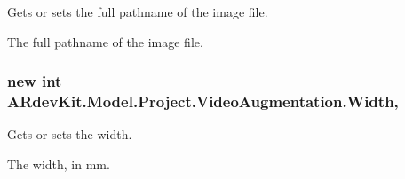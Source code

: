 Gets or sets the full pathname of the image file. 

The full pathname of the image file. \hypertarget{class_a_rdev_kit_1_1_model_1_1_project_1_1_video_augmentation_aad5c2b8555dfe2fd18f2c67c7f34bbda}{
\subsubsection[{Width}]{\setlength{\rightskip}{0pt plus 5cm}new int A\-Rdev\-Kit.\-Model.\-Project.\-Video\-Augmentation.\-Width\hspace{0.3cm}{\ttfamily [get]}, {\ttfamily [set]}}}\label{class_a_rdev_kit_1_1_model_1_1_project_1_1_video_augmentation_aad5c2b8555dfe2fd18f2c67c7f34bbda}


Gets or sets the width. 

The width, in mm. 